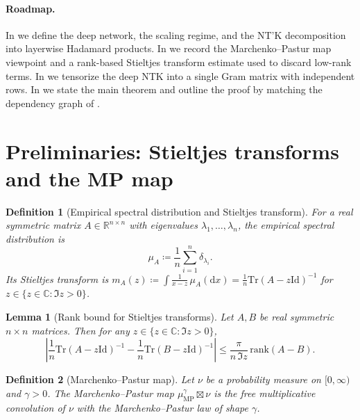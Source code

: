 \documentclass[anon]{colt2026}
\newcommand{\RR}{\mathbb{R}}
\newcommand{\CC}{\mathbb{C}}
\newcommand{\Id}{\mathrm{Id}}
\newcommand{\tr}{\mathrm{Tr}}
\newcommand{\Cplus}{\{z\in\CC:\Im z>0\}}
\newtheorem{lem}{Lemma}
\newtheorem{defn}{Definition}
\begin{document}
\paragraph{Roadmap.}
In  we define the deep network, the scaling regime, and the NT’K decomposition into layerwise Hadamard products.
In  we record the Marchenko--Pastur map viewpoint and a rank-based Stieltjes transform estimate used to discard low-rank terms.
In  we tensorize the deep NTK into a single Gram matrix with independent rows.
In  we state the main theorem and outline the proof by matching the dependency graph of \citet{benigni2025eigenvaluedistributionneuraltangent}.

\section{Preliminaries: Stieltjes transforms and the MP map}
\label{sec:prelim}

\begin{defn}[Empirical spectral distribution and Stieltjes transform]
For a real symmetric matrix $A\in\RR^{n\times n}$ with eigenvalues $\lambda_1,\dots,\lambda_n$, the empirical spectral distribution is
\[
  \mu_A \coloneqq \frac{1}{n}\sum_{i=1}^n \delta_{\lambda_i}.
\]
Its Stieltjes transform is $m_A(z)\coloneqq \int \frac{1}{x-z}\,\mu_A(\mathrm{d}x)=\frac{1}{n}\tr(A-z\Id)^{-1}$ for $z\in\Cplus$.
\end{defn}

\begin{lem}[Rank bound for Stieltjes transforms]\label{lem:rank-st}
Let $A,B$ be real symmetric $n\times n$ matrices.
Then for any $z\in\Cplus$,
\[
  \left|
  \frac{1}{n}\tr(A-z\Id)^{-1}-\frac{1}{n}\tr(B-z\Id)^{-1}
  \right|
  \leq \frac{\pi}{n\,\Im z}\,\mathrm{rank}(A-B).
\]
\end{lem}

\begin{defn}[Marchenko--Pastur map]\label{def:mp-map}
Let $\nu$ be a probability measure on $[0,\infty)$ and $\gamma>0$.
The \emph{Marchenko--Pastur map} $\mu_{\mathrm{MP}}^{\gamma}\boxtimes \nu$ is the free multiplicative convolution of $\nu$ with the Marchenko--Pastur law of shape $\gamma$.
\end{defn}
\end{document}
